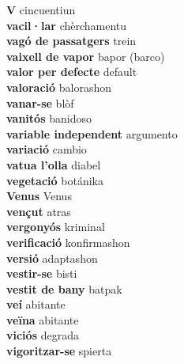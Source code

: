 \textbf{ V  } cincuentiun \\
\textbf{ vacil·lar  } chèrchamentu \\
\textbf{ vagó de passatgers  } trein \\
\textbf{ vaixell de vapor  } bapor (barco) \\
\textbf{ valor per defecte  } default \\
\textbf{ valoració  } balorashon \\
\textbf{ vanar-se  } blòf \\
\textbf{ vanitós  } banidoso \\
\textbf{ variable independent  } argumento \\
\textbf{ variació  } cambio \\
\textbf{ vatua l’olla  } diabel \\
\textbf{ vegetació  } botánika \\
\textbf{ Venus  } Venus \\
\textbf{ vençut  } atras \\
\textbf{ vergonyós  } kriminal \\
\textbf{ verificació  } konfirmashon \\
\textbf{ versió  } adaptashon \\
\textbf{ vestir-se  } bisti \\
\textbf{ vestit de bany  } batpak \\
\textbf{ veí  } abitante \\
\textbf{ veïna  } abitante \\
\textbf{ viciós  } degrada \\
\textbf{ vigoritzar-se  } spierta \\
